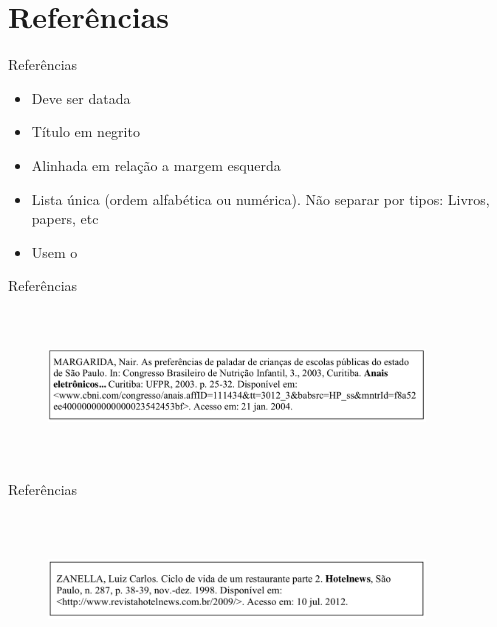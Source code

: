 \section{Referências}

\begin{frame}	
	\begin{block}{Referências}	
		\begin{itemize}
			\item Deve ser datada
			\item Título em negrito
			\item Alinhada em relação a margem esquerda
			\item Lista única (ordem alfabética ou numérica). Não separar por tipos: Livros, papers, etc 
			\item Usem o \href{http://www.more.ufsc.br/}{\color{blue}{MORE}} 
		\end{itemize}
	\end{block}
\end{frame}

\begin{frame}	
	\begin{block}{Referências}	
		 \begin{figure}[!htb]
			\centering	  				
			\includegraphics[height=4cm, width = 10cm]{./pic/referencias/trabalhoeventodigital.png}
			\author{Guia de formatação SENAC }
			\label{fig_referencia01}
		\end{figure}
	\end{block}
\end{frame}

\begin{frame}	
	\begin{block}{Referências}	
		 \begin{figure}[!htb]
			\centering	  				
			\includegraphics[height=4cm, width = 10cm]{./pic/referencias/artigorevistadigital.png}
			\author{Guia de formatação SENAC }
			\label{fig_referencia02}
		\end{figure}
	\end{block}
\end{frame}

